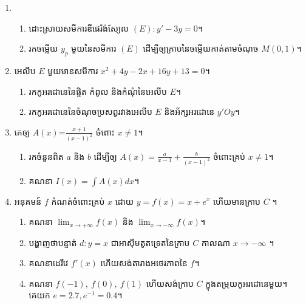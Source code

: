 \documentclass{officialexam}
\begin{document}
  \begin{enumerate}[I]
  	\item \begin{enumerate}[k]
  		\item ដោះស្រាយសមីការឌីផេរ៉ង់ស្យែល $(E): y'-3y=0$។
  		\item រកចម្លើយ $y_p$ មួយនៃសមីការ $(E)$ ដើម្បីឲ្យក្រាបនៃចម្លើយកាត់តាមចំណុច $M\left(0,1\right)$។
  	\end{enumerate}
  	\item អេលីប $E$ មួយមានសមីការ $x^2+4y-2x+16y+13=0$។
  	\begin{enumerate}[k]
  		\item រកកូអរដោនេនៃផ្ចិត កំពូល និងកំណុំនៃអេលីប $E$។
  		\item រកកូអរដោនេនៃចំណុចប្រសព្វរវាងអេលីប $E$ និងអ័ក្សអរដោនេ $y'Oy$។
  	\end{enumerate}
  	\item គេឲ្យ $A(x)$=$\frac{x+1}{\left(x-1\right)^2}$ ចំពោះ $x\ne 1$។
  	\begin{enumerate}[k]
  		\item រកចំនួនពិត $a$ និង $b$ ដើម្បីឲ្យ $A(x)=\frac{a}{x-1}+\frac{b}{\left(x-1\right)^2}$ ចំពោះគ្រប់ $x\ne1$។
  		\item គណនា $I(x)=\int A(x)dx$។
  	\end{enumerate}
  	\item អនុគមន៍ $f$ កំណត់ចំពោះគ្រប់ $x$ ដោយ $y=f(x)=x+e^x$ ហើយមានក្រាប $C$ ។
  	\begin{enumerate}[k]
  		\item គណនា $\lim_{x \to +\infty } f(x)$ និង $\lim_{x \to -\infty } f(x)$។
  		\item បង្ហាញថាបន្ទាត់ $d:y=x$ ជាអាសុីមតូតទ្រេតនៃក្រាប $C$ កាលណា $x\to -\infty$ ។
  		\item គណនាដេរីវេ $f'(x)$ ហើយសង់តារាងអថេរភាពនៃ $f$។
  		\item គណនា $f(-1),~f(0),~f(1)$ ហើយសង់ក្រាប $C$ ក្នុងតម្រុយកូអរដោនេមួយ។ គេយក $e=2.7, e^{-1}=0.4$។
  	\end{enumerate}
  \end{enumerate}
  \newpage
  \maketitle
\end{document}
